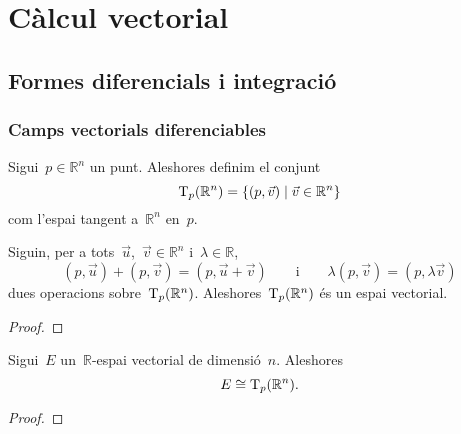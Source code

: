 \documentclass[../geometria-diferencial.tex]{subfiles}
\begin{document}
\chapter{Càlcul vectorial}
\section{Formes diferencials i integració}
    \subsection{Camps vectorials diferenciables}
    \begin{definition}
        \label{def:espai-tangent-a-Rn}
        Sigui~\(p\in\mathbb{R}^{n}\) un punt.
        Aleshores definim el conjunt
        \begin{equation*}
            \operatorname{T}_{p}(\mathbb{R}^{n})=\{(p,\vec{v})\mid\vec{v}\in\mathbb{R}^{n}\}
        \end{equation*}
        com l'espai tangent a~\(\mathbb{R}^{n}\) en~\(p\).
    \end{definition}
    \begin{proposition}
        \label{prop:lespai-tangent-a-Rn-es-un-espai-vectorial}
        Siguin, per a tots~\(\vec{u}\),~\(\vec{v}\in\mathbb{R}^{n}\) i~\(\lambda\in\mathbb{R}\),
        \begin{equation*}
            (p,\vec{u})+(p,\vec{v})=(p,\vec{u}+\vec{v})
            \qquad\text{i}\qquad
            \lambda(p,\vec{v})=(p,\lambda\vec{v})
        \end{equation*}
        dues operacions sobre~\(\operatorname{T}_{p}(\mathbb{R}^{n})\).
        Aleshores~\(\operatorname{T}_{p}(\mathbb{R}^{n})\) és un espai vectorial.
    \end{proposition}
    \begin{proof}
    \end{proof}
    \begin{observation}
        \label{prop:lespai-tangent-a-Rn-es-isomorf-a-un-R-espai-vectorial-de-dimensio-n}
        Sigui~\(E\) un~\(\mathbb{R}\)-espai vectorial de dimensió~\(n\).
        Aleshores
        \begin{equation*}
            E\cong\operatorname{T}_{p}(\mathbb{R}^{n}).
        \end{equation*}
    \end{observation}
    \begin{proof}
    \end{proof}
\end{document}
